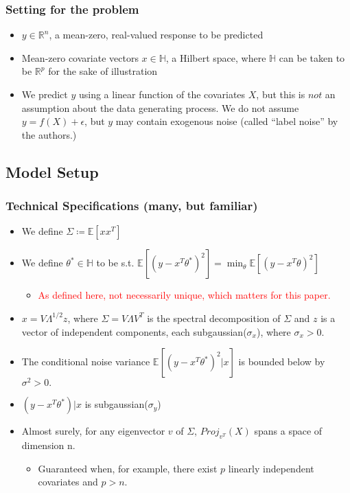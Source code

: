 \documentclass[pdf]{beamer}
\begin{document}
\begin{frame}
\frametitle{Setting for the problem}

\begin{itemize}
\item $y\in \mathbb{R}^{n}$, a mean-zero, real-valued response to be predicted 
\item Mean-zero covariate vectors $x \in \mathbb{H}$, a Hilbert space, where $\mathbb{H}$ can be taken to be $\mathbb{R}^{p}$ for the sake of illustration
\item We predict $y$ using a linear function of the covariates $X$, but this is $\textit{not}$ an assumption about the data generating process.  We do not assume  $y = f(X) + \epsilon$, but $y$ may contain exogenous noise (called ``label noise'' by the authors.)
\end{itemize}
\end{frame}

\subsection{Model Setup}

\begin{frame}
\fontsize{9pt}{8pt}
\frametitle{Technical Specifications (many, but familiar)}

\begin{itemize}
\item We define $\Sigma \coloneqq \mathbb{E}[xx^{T}]$
\item We define $\theta^{*} \in \mathbb{H}$ to be s.t. $\mathbb{E}[(y - x^{T}\theta^{*})^{2}] = \min_{\theta}\mathbb{E}[(y - x^{T}\theta)^{2}]$
\begin{itemize}
    \fontsize{9pt}{8pt}
    \item \textcolor{red}{As defined here, not necessarily unique, which matters for this paper.}
\end{itemize}
\item $x = V\Lambda^{1/2}z$, where $\Sigma = V\Lambda V^{T}$ is the spectral decomposition of $\Sigma$ and $z$ is a vector of independent components, each subgaussian($\sigma_{x}$), where $\sigma_{x} > 0.$
\item The conditional noise variance $\mathbb{E}[(y - x^{T}\theta^{*})^{2}|x]$ is bounded below by $\sigma^{2} > 0.$
\item $(y - x^{T}\theta^{*})|x$ is subgaussian($\sigma_{y}$)
\item Almost surely, for any eigenvector $v$ of $\Sigma$, $Proj_{v^{T}}(X)$ spans a space of dimension n.
    \begin{itemize}
    \fontsize{9pt}{8pt}
    \item Guaranteed when, for example, there exist $p$ linearly independent covariates and $p > n.$ 
    \end{itemize}
\end{itemize}

\end{frame}
\end{document}

